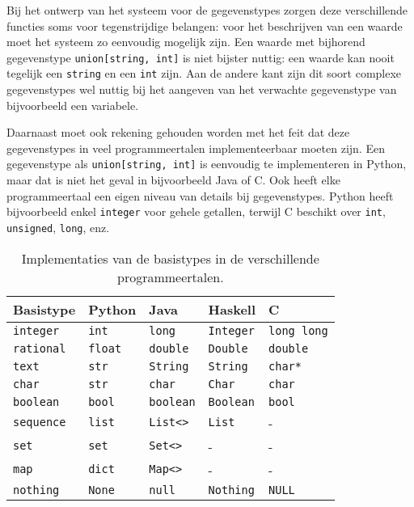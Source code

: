 Bij het ontwerp van het systeem voor de gegevenstypes zorgen deze verschillende functies soms voor tegenstrijdige belangen: voor het beschrijven van een waarde moet het systeem zo eenvoudig mogelijk zijn.
Een waarde met bijhorend gegevenstype \texttt{union[string, int]} is niet bijster nuttig: een waarde kan nooit tegelijk een \texttt{string} en een \texttt{int} zijn.
Aan de andere kant zijn dit soort complexe gegevenstypes wel nuttig bij het aangeven van het verwachte gegevenstype van bijvoorbeeld een variabele.

Daarnaast moet ook rekening gehouden worden met het feit dat deze gegevenstypes in veel programmeertalen implementeerbaar moeten zijn.
Een gegevenstype als \texttt{union[string, int]} is eenvoudig te implementeren in Python, maar dat is niet het geval in bijvoorbeeld Java of C\@.
Ook heeft elke programmeertaal een eigen niveau van details bij gegevenstypes.
Python heeft bijvoorbeeld enkel \texttt{integer} voor gehele getallen, terwijl C beschikt over \texttt{int}, \texttt{unsigned}, \texttt{long}, enz.

\begin{table}
    \centering
    \caption{Implementaties van de basistypes in de verschillende programmeertalen.}
    \label{tab:basistypes}
    \begin{tabular}{|l|llll|}
        \hline
        Basistype         & Python          & Java              & Haskell           & C \\
        \hline
        \texttt{integer}  & \texttt{int}    & \texttt{long}     & \texttt{Integer}  & \texttt{long long} \\
        \texttt{rational} & \texttt{float}  & \texttt{double}   & \texttt{Double}   & \texttt{double}    \\
        \texttt{text}     & \texttt{str}    & \texttt{String}   & \texttt{String}   & \texttt{char*}     \\
        \texttt{char}     & \texttt{str}    & \texttt{char}     & \texttt{Char}     & \texttt{char}      \\
        \texttt{boolean}  & \texttt{bool}   & \texttt{boolean}  & \texttt{Boolean}  & \texttt{bool}      \\
        \texttt{sequence} & \texttt{list}   & \texttt{List<>}   & \texttt{List}     & -                  \\
        \texttt{set}      & \texttt{set}    & \texttt{Set<>}    & -                 & -                  \\
        \texttt{map}      & \texttt{dict}   & \texttt{Map<>}    & -                 & -                  \\
        \texttt{nothing}  & \texttt{None}   & \texttt{null}     & \texttt{Nothing}  & \texttt{NULL}      \\
        \hline
    \end{tabular}
\end{table}

